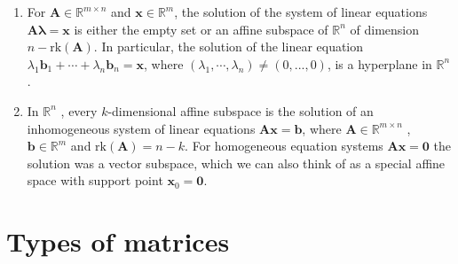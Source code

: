 \begin{enumerate}
    \item For $\bm{A} \in \mathbb{R}^{m\times n}$ and $\bm{x} \in \mathbb{R}^m$, the solution of the system of linear equations $\bm{A} \bm{\lambda}  = \bm{x}$ is either the empty set or an affine subspace of $\mathbb{R}^n$ of dimension $n - \text{rk}(\bm{A})$. 
    In particular, the solution of the linear equation $\lambda _1 \bm{b}_1 + \cdots + \lambda _n \bm{b}_n = \bm{x}$, where $(\lambda _1, \cdots , \lambda _n) \neq (0, . . . , 0)$, is a hyperplane in $\mathbb{R}^n$ .
    \hfill \cite{mfml/book/mml/Deisenroth-Faisal-Ong}

    \item In $\mathbb{R}^n$ , every $k$-dimensional affine subspace is the solution of an inhomogeneous system of linear equations $\bm{Ax} = \bm{b}$, where $\bm{A} \in \mathbb{R}^{m\times n}$ , $\bm{b} \in \mathbb{R}^m$ and $\text{rk}(\bm{A}) = n - k$. 
    For homogeneous equation systems $\bm{Ax} = \bm{0}$ the solution was a vector subspace, which we can also think of as a special affine space with support point $\bm{x}_0 = \bm{0}$.
    \hfill \cite{mfml/book/mml/Deisenroth-Faisal-Ong}
\end{enumerate}

























\section{Types of matrices}

















